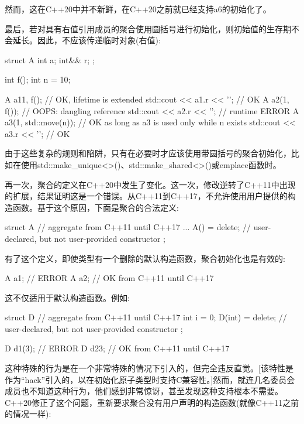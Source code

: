 然而，这在C++20中并不新鲜，在C++20之前就已经支持a6的初始化了。

最后，若对具有右值引用成员的聚合使用圆括号进行初始化，则初始值的生存期不会延长。因此，不应该传递临时对象(右值):

\begin{cpp}
struct A {
	int a;
	int&& r;
};

int f();
int n = 10;

A a1{1, f()}; // OK, lifetime is extended
std::cout << a1.r << '\n'; // OK
A a2(1, f()); // OOPS: dangling reference
std::cout << a2.r << '\n'; // runtime ERROR
A a3(1, std::move(n)); // OK as long as a3 is used only while n exists
std::cout << a3.r << '\n'; // OK
\end{cpp}

由于这些复杂的规则和陷阱，只有在必要时才应该使用带圆括号的聚合初始化，比如在使用std::make\_unique<>()、std::make\_shared<>()或emplace函数时。


再一次，聚合的定义在C++20中发生了变化。这一次，修改逆转了C++11中出现的扩展，结果证明这是一个错误。从C++11到C++17，不允许使用用户提供的构造函数。基于这个原因，下面是聚合的合法定义:

\begin{cpp}
struct A { // aggregate from C++11 until C++17
	...
	A() = delete; // user-declared, but not user-provided constructor
};
\end{cpp}

有了这个定义，即使类型有一个删除的默认构造函数，聚合初始化也是有效的:

\begin{cpp}
A a1; // ERROR
A a2{}; // OK from C++11 until C++17
\end{cpp}

这不仅适用于默认构造函数。例如:

\begin{cpp}
struct D { // aggregate from C++11 until C++17
	int i = 0;
	D(int) = delete; // user-declared, but not user-provided constructor
};

D d1(3); // ERROR
D d2{3}; // OK from C++11 until C++17
\end{cpp}

这种特殊的行为是在一个非常特殊的情况下引入的，但完全违反直觉。[该特性是作为“hack”引入的，以在初始化原子类型时支持C兼容性。]然而，就连几名委员会成员也不知道这种行为，他们感到非常惊讶，甚至发现这种支持根本不需要。C++20修正了这个问题，重新要求聚合没有用户声明的构造函数(就像C++11之前的情况一样):

